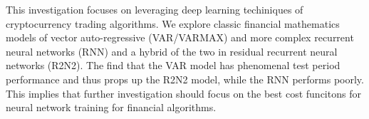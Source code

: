 This investigation focuses on leveraging deep learning techiniques of cryptocurrency trading algorithms. We explore classic financial mathematics models of vector auto-regressive (VAR/VARMAX) and more complex recurrent neural networks (RNN) and a hybrid of the two in residual recurrent neural networks (R2N2). The find that the VAR model has phenomenal test period performance and thus props up the R2N2 model, while the RNN performs poorly. This implies that further investigation should focus on the best cost funcitons for neural network training for financial algorithms.